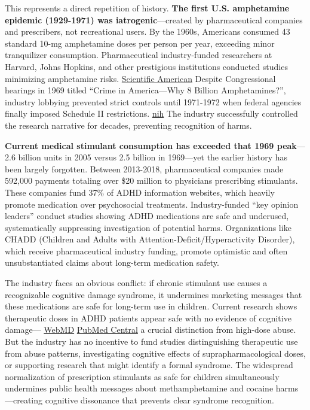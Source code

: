 This represents a direct repetition of history. \textbf{The first U.S. amphetamine epidemic (1929-1971) was iatrogenic}---created by pharmaceutical companies and prescribers, not recreational users. By the 1960s, Americans consumed 43 standard 10-mg amphetamine doses per person per year, exceeding minor tranquilizer consumption. Pharmaceutical industry-funded researchers at Harvard, Johns Hopkins, and other prestigious institutions conducted studies minimizing amphetamine risks. \href{https://www.scientificamerican.com/article/big-pharma-s-manufactured-epidemic-the-misdiagnosis-of-adhd/}{Scientific American} Despite Congressional hearings in 1969 titled ``Crime in America---Why 8 Billion Amphetamines?'', industry lobbying prevented strict controls until 1971-1972 when federal agencies finally imposed Schedule II restrictions. \href{https://pmc.ncbi.nlm.nih.gov/articles/PMC2377281/}{nih} The industry successfully controlled the research narrative for decades, preventing recognition of harms.

\textbf{Current medical stimulant consumption has exceeded that 1969 peak}---2.6 billion units in 2005 versus 2.5 billion in 1969---yet the earlier history has been largely forgotten. Between 2013-2018, pharmaceutical companies made 592,000 payments totaling over \$20 million to physicians prescribing stimulants. These companies fund 37\% of ADHD information websites, which heavily promote medication over psychosocial treatments. Industry-funded ``key opinion leaders'' conduct studies showing ADHD medications are safe and underused, systematically suppressing investigation of potential harms. Organizations like CHADD (Children and Adults with Attention-Deficit/Hyperactivity Disorder), which receive pharmaceutical industry funding, promote optimistic and often unsubstantiated claims about long-term medication safety.

The industry faces an obvious conflict: if chronic stimulant use causes a recognizable cognitive damage syndrome, it undermines marketing messages that these medications are safe for long-term use in children. Current research shows therapeutic doses in ADHD patients appear safe with no evidence of cognitive damage--- \href{https://www.webmd.com/add-adhd/long-term-risks-adhd-medications}{WebMD} \href{https://pmc.ncbi.nlm.nih.gov/articles/PMC4147667/}{PubMed Central} a crucial distinction from high-dose abuse. But the industry has no incentive to fund studies distinguishing therapeutic use from abuse patterns, investigating cognitive effects of suprapharmacological doses, or supporting research that might identify a formal syndrome. The widespread normalization of prescription stimulants as safe for children simultaneously undermines public health messages about methamphetamine and cocaine harms---creating cognitive dissonance that prevents clear syndrome recognition.

